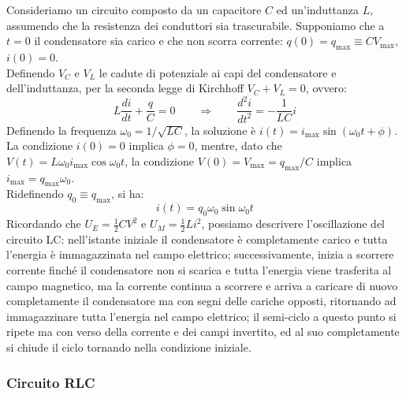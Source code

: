 Consideriamo un circuito composto da un capacitore $ C $ ed un'induttanza $ L $, assumendo che la resistenza dei conduttori sia trascurabile. Supponiamo che a $ t = 0 $ il condensatore sia carico e che non scorra corrente: $ q(0) = q_{\text{max}} \equiv C V_{\text{max}} $, $ i(0) = 0 $. \\ 
%
Definendo $ V_C $ e $ V_L $ le cadute di potenziale ai capi del condensatore e dell'induttanza, per la seconda legge di Kirchhoff $ V_C + V_L = 0 $, ovvero:
\begin{equation}
	L \frac{di}{dt} + \frac{q}{C} = 0 \qquad\Longrightarrow\qquad \frac{d^2 i}{dt^2} = -\frac{1}{LC} i
	\label{eq:41}
\end{equation}
Definendo la frequenza $ \omega_0 = 1 / \sqrt{LC} $, la soluzione è $ i(t) = i_{\text{max}} \sin(\omega_0 t + \phi) $. La condizione $ i(0) = 0 $ implica $ \phi = 0 $, mentre, dato che $ V(t) = L \omega_0 i_{\text{max}} \cos\omega_0 t $, la condizione $ V(0) = V_{\text{max}} = q_{\text{max}} / C $ implica $ i_{\text{max}} = q_{\text{max}}\omega_0 $. \\ 
%
Ridefinendo $ q_0 \equiv q_{\text{max}} $, si ha:
\begin{equation}
	i(t) = q_0 \omega_0 \sin\omega_0 t
	\label{eq:42}
\end{equation}
Ricordando che $ U_E = \frac{1}{2} CV^2 $ e $ U_M = \frac{1}{2} Li^2 $, possiamo descrivere l'oscillazione del circuito LC: nell'istante iniziale il condensatore è completamente carico e tutta l'energia è immagazzinata nel campo elettrico; successivamente, inizia a scorrere corrente finché il condensatore non si scarica e tutta l'energia viene trasferita al campo magnetico, ma la corrente continua a scorrere e arriva a caricare di nuovo completamente il condensatore ma con segni delle cariche opposti, ritornando ad immagazzinare tutta l'energia nel campo elettrico; il semi-ciclo a questo punto si ripete ma con verso della corrente e dei campi invertito, ed al suo completamente si chiude il ciclo tornando nella condizione iniziale.

\subsubsection{Circuito RLC}

